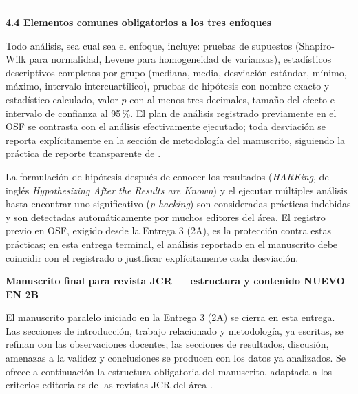 \documentclass[11pt,a4paper]{article}
\newcounter{secc}
\newcommand{\secband}[1]{%
    \stepcounter{secc}\par\vspace{9pt}\noindent
    {\setlength{\fboxsep}{0pt}%
        \colorbox{uteqgold}{\parbox[c][20pt][c]{0.05\textwidth}{\centering\textbf{\color{white}\small \arabic{secc}}}}%
        \colorbox{uteqgreen}{\parbox[c][20pt][c]{0.95\textwidth}{\hspace{8pt}\textbf{\color{white}\small #1}}}%
    }\par\vspace{5pt}}
\newcommand{\submark}[1]{\par\vspace{4pt}\noindent
    {\color{uteqgreen}\rule[-1pt]{3.5pt}{12pt}}\hspace{6pt}\textbf{\color{uteqgreen}#1}\par\vspace{2pt}}
\newcommand{\bF}{{\setlength{\fboxsep}{1.5pt}\colorbox{crimsonfin}{\scriptsize\bfseries\color{white}NUEVO EN 2B}}}
\begin{document}
\submark{4.4 Elementos comunes obligatorios a los tres enfoques}
Todo análisis, sea cual sea el enfoque, incluye: pruebas de supuestos (Shapiro-Wilk para normalidad, Levene para homogeneidad de varianzas), estadísticos descriptivos completos por grupo (mediana, media, desviación estándar, mínimo, máximo, intervalo intercuartílico), pruebas de hipótesis con nombre exacto y estadístico calculado, valor $p$ con al menos tres decimales, tamaño del efecto e intervalo de confianza al 95\,\%.
El plan de análisis registrado previamente en el OSF se contrasta con el análisis efectivamente ejecutado; toda desviación se reporta explícitamente en la sección de metodología del manuscrito, siguiendo la práctica de reporte transparente de \cite{simmons2011false,nosek2018preregistration}.

\begin{alertbox}[title=Advertencia específica sobre p-hacking y \emph{HARKing}]
    La formulación de hipótesis después de conocer los resultados (\emph{HARKing}, del inglés \emph{Hypothesizing After the Results are Known}) \cite{kerr1998harking} y el ejecutar múltiples análisis hasta encontrar uno significativo (\emph{p-hacking}) \cite{simmons2011false} son consideradas prácticas indebidas y son detectadas automáticamente por muchos editores del área.
    El registro previo en OSF, exigido desde la Entrega 3 (2A), es la protección contra estas prácticas; en esta entrega terminal, el análisis reportado en el manuscrito debe coincidir con el registrado o justificar explícitamente cada desviación.
\end{alertbox}
\secband{Manuscrito final para revista JCR --- estructura y contenido \bF}

El manuscrito paralelo iniciado en la Entrega 3 (2A) se cierra en esta entrega.
Las secciones de introducción, trabajo relacionado y metodología, ya escritas, se refinan con las observaciones docentes; las secciones de resultados, discusión, amenazas a la validez y conclusiones se producen con los datos ya analizados.
Se ofrece a continuación la estructura obligatoria del manuscrito, adaptada a los criterios editoriales de las revistas JCR del área \cite{req_eng_journal_2025,ist_journal_2025,ese_journal_2025,jss_journal_2025}.
\end{document}
